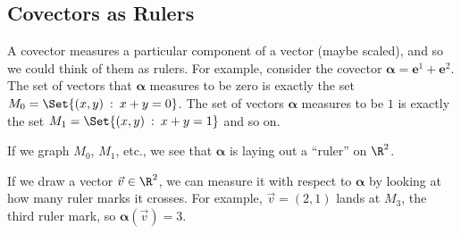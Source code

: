 \subsection{Covectors as Rulers}

A covector measures a particular component of a vector (maybe scaled), and
so we could think of them as rulers.  For example, consider the covector
$\bm\alpha = \bm e^1+\bm e^2$.  The set of vectors that $\bm\alpha$ measures
to be zero is exactly the set $M_0=\Set{(x,y)\given x+y=0}$.  The set of vectors
$\bm\alpha$ measures to be $1$ is exactly the set $M_1=\Set{(x,y)\given x+y=1}$ and so on.

If we graph $M_0$, $M_1$, etc., we see that $\bm\alpha$ is laying out a ``ruler'' on $\R^2$.

\begin{center}
\end{center}

If we draw a vector $\vec v\in \R^2$, we can measure it with respect to $\bm\alpha$ by
looking at how many ruler marks it crosses.  For example, $\vec v=(2,1)$ lands at $M_3$, the
third ruler mark, so $\bm\alpha(\vec v) = 3$.

